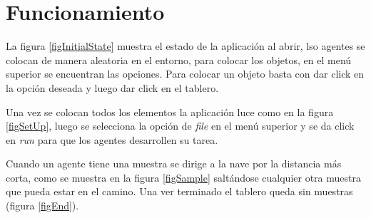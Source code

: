 \section{Funcionamiento}
	La figura \ref*{figInitialState} muestra el estado de la aplicación al abrir, lso agentes se colocan de manera aleatoria en el entorno, para colocar los objetos, en el menú superior se encuentran las opciones. Para colocar un objeto basta con dar click en la opción deseada y luego dar click en el tablero.
	
	Una vez se colocan todos los elementos la aplicación luce como en la figura \ref*{figSetUp}, luego se selecciona la opción de \textit{file} en el menú superior y se da click en \textit{run} para que los agentes desarrollen su tarea.
	
	Cuando un agente tiene una muestra se dirige a la nave por la distancia más corta, como se muestra en la figura \ref*{figSample} saltándose cualquier otra muestra que pueda estar en el camino. Una ver terminado el tablero queda sin muestras (figura \ref*{figEnd}).
	
